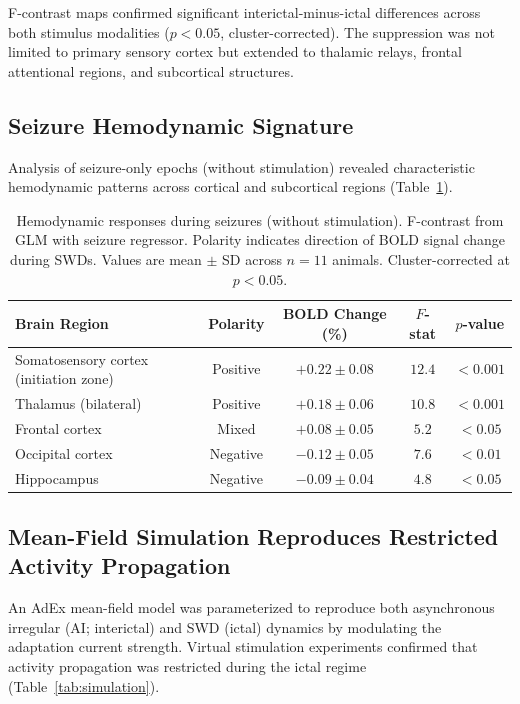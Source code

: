 \documentclass[11pt]{article}
\begin{document}
F-contrast maps confirmed significant interictal-minus-ictal differences across both stimulus modalities ($p < 0.05$, cluster-corrected). The suppression was not limited to primary sensory cortex but extended to thalamic relays, frontal attentional regions, and subcortical structures.

\subsection{Seizure Hemodynamic Signature}

Analysis of seizure-only epochs (without stimulation) revealed characteristic hemodynamic patterns across cortical and subcortical regions (Table~\ref{tab:seizure_hemo}).

\begin{table}[H]
\centering
\caption{Hemodynamic responses during seizures (without stimulation). F-contrast from GLM with seizure regressor. Polarity indicates direction of BOLD signal change during SWDs. Values are mean $\pm$ SD across $n = 11$ animals. Cluster-corrected at $p < 0.05$.}
\label{tab:seizure_hemo}
\begin{tabular}{lcccc}
\toprule
\textbf{Brain Region} & \textbf{Polarity} & \textbf{BOLD Change (\%)} & \textbf{$F$-stat} & \textbf{$p$-value} \\
\midrule
Somatosensory cortex (initiation zone) & Positive & $+0.22 \pm 0.08$ & $12.4$ & $< 0.001$ \\
Thalamus (bilateral) & Positive & $+0.18 \pm 0.06$ & $10.8$ & $< 0.001$ \\
Frontal cortex & Mixed & $+0.08 \pm 0.05$ & $5.2$ & $< 0.05$ \\
Occipital cortex & Negative & $-0.12 \pm 0.05$ & $7.6$ & $< 0.01$ \\
Hippocampus & Negative & $-0.09 \pm 0.04$ & $4.8$ & $< 0.05$ \\
\bottomrule
\end{tabular}
\end{table}

\subsection{Mean-Field Simulation Reproduces Restricted Activity Propagation}

An AdEx mean-field model \citep{brette2005adaptive} was parameterized to reproduce both asynchronous irregular (AI; interictal) and SWD (ictal) dynamics by modulating the adaptation current strength. Virtual stimulation experiments confirmed that activity propagation was restricted during the ictal regime (Table~\ref{tab:simulation}).
\end{document}
